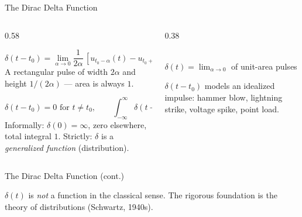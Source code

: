 \documentclass[aspectratio=169,11pt]{beamer}
\begin{document}
\begin{frame}{The Dirac Delta Function}
\footnotesize
\begin{columns}[T]
\begin{column}{0.58\textwidth}
\begin{formulabox}
\[\delta(t - t_0) = \lim_{\alpha \to 0} \frac{1}{2\alpha}\,[u_{t_0-\alpha}(t) - u_{t_0+\alpha}(t)]\]
A rectangular pulse of width $2\alpha$ and height $1/(2\alpha)$ --- area is always $1$.
\end{formulabox}
\vspace{0.5mm}
\begin{formulabox}
\[\delta(t - t_0) = 0 \text{ for } t \ne t_0, \qquad \int_{-\infty}^{\infty} \delta(t-t_0)\,dt = 1\]
Informally: $\delta(0) = \infty$, zero elsewhere, total integral $1$. Strictly: $\delta$ is a \emph{generalized function} (distribution).
\end{formulabox}
\end{column}
\begin{column}{0.38\textwidth}
\centering
{}\\[2mm]
{\footnotesize\color{workpurple}$\delta(t) = \lim_{\alpha\to 0}$ of unit-area pulses}
\vspace{1mm}
\begin{conceptbox}
$\delta(t-t_0)$ models an idealized impulse: hammer blow, lightning strike, voltage spike, point load.
\end{conceptbox}
\end{column}
\end{columns}
\end{frame}

\begin{frame}{The Dirac Delta Function (cont.)}
\footnotesize
\begin{warningbox}
$\delta(t)$ is \emph{not} a function in the classical sense. The rigorous foundation is the theory of distributions (Schwartz, 1940s).
\end{warningbox}
\end{frame}
\end{document}
